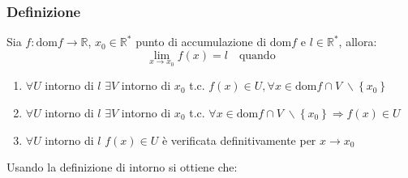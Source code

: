 \documentclass[a4paper]{article}
\newcommand\dom{\text{dom}}
\begin{document}
\subsubsection*{Definizione}
Sia \(f: \dom f \to \mathbb{R}\), \(x_0 \in \mathbb{R}^*\) punto di accumulazione di \(\dom f\) e \(l \in \mathbb{R}^*\), allora:
\[\lim_{x \to x_0} f(x) = l \quad \text{quando}\]
\begin{enumerate}
	\item \(\forall U\) intorno di \(l\) \(\exists V\) intorno di \(x_0\) t.c. \(f(x) \in U, \forall x \in \dom f \cap V \; \backslash \left\{ x_0 \right\}\)
	\item \(\forall U\) intorno di \(l\) \(\exists V\) intorno di \(x_0\) t.c. \(\forall x \in \dom f \cap V \; \backslash \left\{ x_0 \right\} \Rightarrow f(x) \in U\)
	\item \(\forall U\) intorno di \(l\) \(f(x) \in U\) è verificata definitivamente per \(x \to x_0\)
\end{enumerate}
Usando la definizione di intorno si ottiene che:
\end{document}
